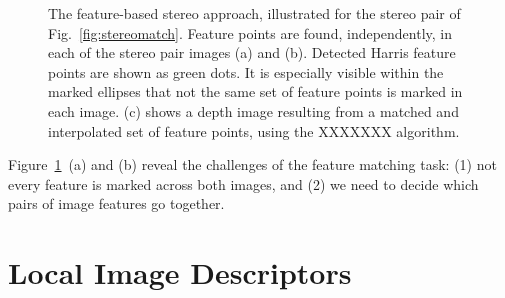 \begin{figure}
\centerline{
}
\caption{The feature-based stereo approach, illustrated for the stereo pair of Fig.~\ref{fig:stereomatch}.  Feature points are found, independently, in each of the stereo pair images (a) and (b).  Detected Harris feature points \cite{Harris1988} are shown as green dots. It is especially visible within the marked ellipses that not the same set of feature points is marked in each image.  (c) shows a depth image resulting from a matched and interpolated set of feature points, using the XXXXXXX algorithm.}
\label{fig:stereopoints}
\end{figure}

Figure~\ref{fig:stereopoints}~(a) and (b) reveal the challenges of the feature matching task:  (1) not every feature is marked across both images, and (2) we need to decide which pairs of image features go together.  

\section{Local Image Descriptors}

